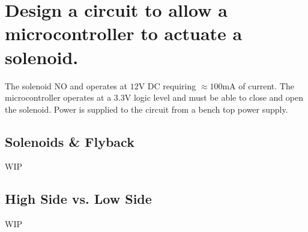 \documentclass[main.tex]{subfiles}
\begin{document}
\section{Design a circuit to allow a microcontroller to actuate a solenoid.} \label{section:switching}

The solenoid NO and operates at $12\text{V}$ DC requiring $\approx 100\text{mA}$ of current. The microcontroller operates at a $3.3\text{V}$ logic level and must be able to close and open the solenoid. Power is supplied to the circuit from a bench top power supply. 

\spoilerline

\subsection{Solenoids \& Flyback}
WIP

\subsection{High Side vs. Low Side}
WIP

\end{document}
